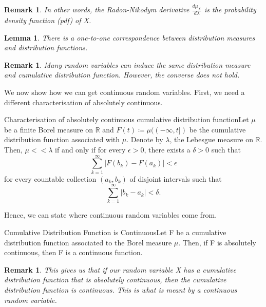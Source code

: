 \documentclass[twoside]{article}
\newtheorem{lemma}[theorem]{Lemma}
\newtheorem{remark}[theorem]{Remark}
\begin{document}
\begin{remark}In other words, the Radon-Nikodym derivative $\frac{d\mu_X}{d\lambda}$ is the probability density function (pdf) of X. 
\end{remark}


\begin{lemma}There is a one-to-one correspondence between distribution measures and distribution functions.
\end{lemma}

\begin{remark}
Many random variables can induce the same distribution measure and cumulative distribution function. However, the converse does not hold.
\end{remark}


We now show how we can get continuous random variables. First, we need a different characterisation of absolutely continuous.

\begin{theorem_exam}{Characterisation of absolutely continuous cumulative distribution function}{}Let $\mu$ be a finite Borel measure on $\mathbb{R}$ and $F(t) \coloneqq \mu((-\infty,t])$ be the cumulative distribution function associated with $\mu$. Denote by $\lambda$, the Lebesgue measure on $\mathbb{R}.$ Then, $\mu << \lambda$ if and only if for every $\epsilon > 0$, there exists a $\delta > 0$ such that 
$$
\sum_{k=1}^{\infty}|F(b_k) - F(a_k)| < \epsilon
$$
for every countable collection $(a_k, b_k)$ of disjoint intervals such that 
$$
\sum_{k=1}^{\infty}|b_k - a_k| < \delta.
$$
\end{theorem_exam}

Hence, we can state where continuous random variables come from.
\begin{proposition_exam}{Cumulative Distribution Function is Continuous}{}Let F be a cumulative distribution function associated to the Borel measure $\mu$. Then, if F is absolutely continuous, then F is a continuous function.
\end{proposition_exam}

\begin{remark}This gives us that if our random variable X has a cumulative distribution function that is absolutely continuous, then the cumulative distribution function is continuous. This is what is meant by a continuous random variable.
\end{remark}
\end{document}
